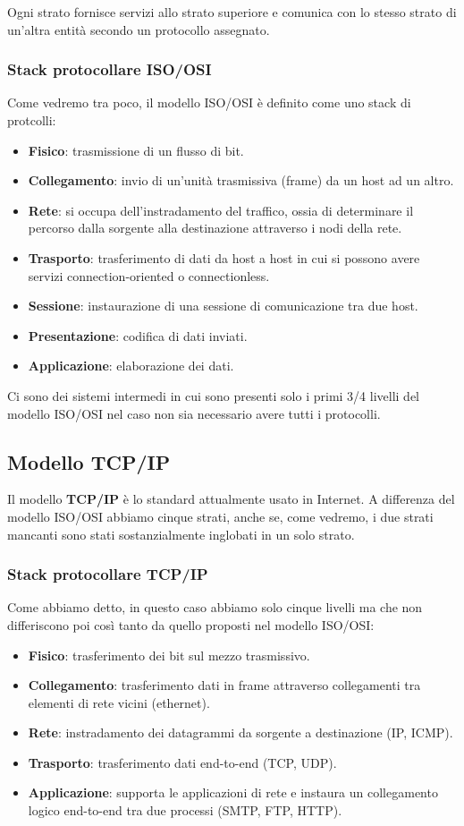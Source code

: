 Ogni strato fornisce servizi allo strato superiore e comunica con lo 
stesso strato di un'altra entità secondo un protocollo assegnato.

\subsubsection{Stack protocollare ISO/OSI}
Come vedremo tra poco, il modello ISO/OSI è definito come uno stack di
protcolli:
\begin{itemize}
	\item \textbf{Fisico}: trasmissione di un flusso di bit.
	\item \textbf{Collegamento}: invio di un'unità trasmissiva (frame)
		da un host ad un altro.
	\item \textbf{Rete}: si occupa dell'instradamento del traffico, 
		ossia di determinare il percorso dalla sorgente alla 
		destinazione attraverso i nodi della rete.
	\item \textbf{Trasporto}: trasferimento di dati da host a host in 
		cui si possono avere servizi connection-oriented o 
		connectionless.
	\item \textbf{Sessione}: instaurazione di una sessione di 
		comunicazione tra due host.
	\item \textbf{Presentazione}: codifica di dati inviati.
	\item \textbf{Applicazione}: elaborazione dei dati.
\end{itemize}
Ci sono dei sistemi intermedi in cui sono presenti solo i primi 3/4 
livelli del modello ISO/OSI nel caso non sia necessario avere tutti i
protocolli.

\subsection{Modello TCP/IP}
Il modello \textbf{TCP/IP} è lo standard attualmente usato in Internet.
A differenza del modello ISO/OSI abbiamo cinque strati, anche se, come
vedremo, i due strati mancanti sono stati sostanzialmente inglobati in
un solo strato.

\subsubsection{Stack protocollare TCP/IP}
Come abbiamo detto, in questo caso abbiamo solo cinque livelli ma che 
non differiscono poi così tanto da quello proposti nel modello ISO/OSI:
\begin{itemize}
	\item \textbf{Fisico}: trasferimento dei bit sul mezzo trasmissivo.
	\item \textbf{Collegamento}: trasferimento dati in frame attraverso
		collegamenti tra elementi di rete vicini (ethernet).
	\item \textbf{Rete}: instradamento dei datagrammi da sorgente a
		destinazione (IP, ICMP).
	\item \textbf{Trasporto}: trasferimento dati end-to-end (TCP, 
		UDP).
	\item \textbf{Applicazione}: supporta le applicazioni di rete e
		instaura un collegamento logico end-to-end tra due processi
		(SMTP, FTP, HTTP).
\end{itemize}

